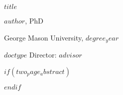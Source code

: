 \documentclass[11 pt]{report}
\begin{document}
\tableofcontents

\listoftables

\listoffigures

%                                        


    \pagebreak
    \baselineskip=0.25pc
    \lineskip=0.25pc
    \lineskiplimit=0.25pc

    \thispagestyle{empty}


    \baselineskip=1pc
    \lineskip=1pc
    \lineskiplimit=1pc

    \vskip 0.25cm
    \noi
    \rm\uppercase\expandafter{$title$}
    \nl

     \baselineskip=1pc
     \lineskip=1pc
     \lineskiplimit=1pc

    \noi
    $author$, PhD
    \nl

    \noi
    George Mason University, $degree_year$
    \nl

    \noi
    $doctype$ Director: $advisor$
    \nl

    \vskip 46pt




$if(two_page_abstract)$
\pagebreak \thispagestyle{empty}


$endif$


%
\end{document}
